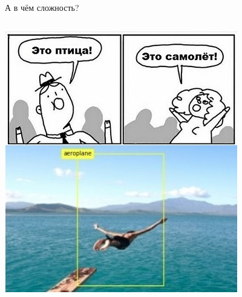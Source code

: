 \documentclass[aspectratio=169, professionalfonts]{beamer}
\begin{document}
\begin{frame}{А в чём сложность?}
\begin{columns}
\begin{column}{.33\linewidth}
            \includegraphics[width=\linewidth]{graphs/fig7_3.jpg}
        \end{column}
    \end{columns}
\end{frame}
\end{document}
